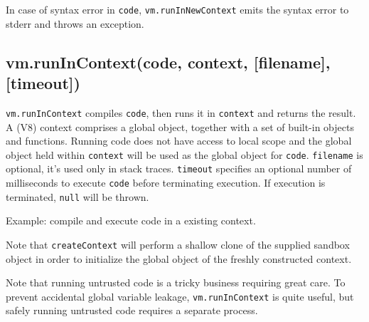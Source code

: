 In case of syntax error in \texttt{code}, \texttt{vm.runInNewContext}
emits the syntax error to stderr and throws an exception.

\subsection{vm.runInContext(code, context, {[}filename{]},
{[}timeout{]})}

\texttt{vm.runInContext} compiles \texttt{code}, then runs it in
\texttt{context} and returns the result. A (V8) context comprises a
global object, together with a set of built-in objects and functions.
Running code does not have access to local scope and the global object
held within \texttt{context} will be used as the global object for
\texttt{code}. \texttt{filename} is optional, it's used only in stack
traces. \texttt{timeout} specifies an optional number of milliseconds to
execute \texttt{code} before terminating execution. If execution is
terminated, \texttt{null} will be thrown.

Example: compile and execute code in a existing context.

\begin{Shaded}
\begin{Highlighting}[]
 \NormalTok{),}
    \NormalTok{),}
      \NormalTok{: }\NormalTok{,}
      \NormalTok{: }
    \NormalTok{\},}

\NormalTok{(}\NormalTok{);}
\NormalTok{(}

\end{Highlighting}
\end{Shaded}

Note that \texttt{createContext} will perform a shallow clone of the
supplied sandbox object in order to initialize the global object of the
freshly constructed context.

Note that running untrusted code is a tricky business requiring great
care. To prevent accidental global variable leakage,
\texttt{vm.runInContext} is quite useful, but safely running untrusted
code requires a separate process.

